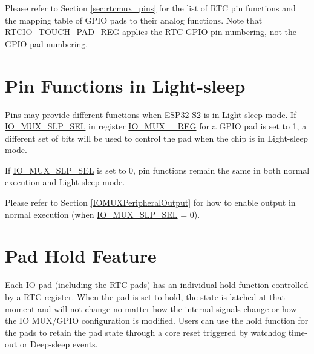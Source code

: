 \documentclass[main\_\_EN.tex]{subfiles}
\begin{document}
Please refer to Section \ref{sec:rtcmux_pins} for the list of RTC pin functions and the mapping table of GPIO pads to their analog functions. Note that \hyperref[regdesc:RTCIOTOUCHPADNREG]{RTCIO\_TOUCH\_PAD\_REG} applies the RTC GPIO pin numbering, not the GPIO pad numbering.

\section{Pin Functions in Light-sleep}

Pins may provide different functions when ESP32-S2 is in Light-sleep mode. If \hyperref[fielddesc:IOMUXSLPSEL]{IO\_MUX\_SLP\_SEL} in register \hyperref[regdesc:IOMUXnREG]{IO\_MUX\_\_REG} for a GPIO pad is set to 1, a different set of bits will be used to control the pad when the chip is in Light-sleep mode.



If \hyperref[fielddesc:IOMUXSLPSEL]{IO\_MUX\_SLP\_SEL} is set to 0, pin functions remain the same in both normal execution and Light-sleep mode.

\begin{tiplisting}
Please refer to Section \ref{IOMUXPeripheralOutput} for how to enable output in normal execution (when \hyperref[fielddesc:IOMUXSLPSEL]{IO\_MUX\_SLP\_SEL} = 0).
\end{tiplisting}


\section{Pad Hold Feature}\label{PadHold}

Each IO pad (including the RTC pads) has an individual hold function controlled by a RTC register. When the pad is set to hold, the state is latched at that moment and will not change no matter how the internal signals change or how the IO MUX/GPIO configuration is modified. Users can use the hold function for the pads to retain the pad state through a core reset triggered by watchdog time-out or Deep-sleep events.
\end{document}
